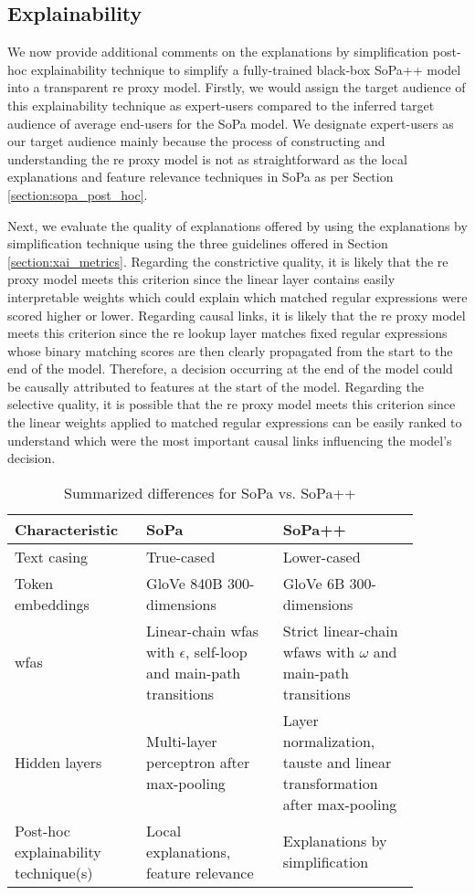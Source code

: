 \subsection{Explainability}

We now provide additional comments on the explanations by simplification
post-hoc explainability technique to simplify a fully-trained black-box SoPa++
model into a transparent \ac{re} proxy model. Firstly, we would assign the target
audience of this explainability technique as expert-users compared to the
inferred target audience of average end-users for the SoPa model. We designate
expert-users as our target audience mainly because the process of constructing
and understanding the \ac{re} proxy model is not as straightforward as the local
explanations and feature relevance techniques in SoPa as per Section
\ref{section:sopa_post_hoc}.

Next, we evaluate the quality of explanations offered by using the explanations
by simplification technique using the three guidelines offered in Section
\ref{section:xai_metrics}. Regarding the constrictive quality, it is likely that
the \ac{re} proxy model meets this criterion since the linear layer contains
easily interpretable weights which could explain which matched regular
expressions were scored higher or lower. Regarding causal links, it is likely
that the \ac{re} proxy model meets this criterion since the \ac{re} lookup layer
matches fixed regular expressions whose binary matching scores are then clearly
propagated from the start to the end of the model. Therefore, a decision
occurring at the end of the model could be causally attributed to features at
the start of the model. Regarding the selective quality, it is possible that the
\ac{re} proxy model meets this criterion since the linear weights applied to
matched regular expressions can be easily ranked to understand which were the
most important causal links influencing the model's decision.

\begin{table}[t!]
  \centering {}
  \begin{tabular}{L{0.275\linewidth} L{0.3\linewidth} L{0.3\linewidth}}
    \toprule
    Characteristic & SoPa & SoPa++ \\
    \midrule
    Text casing & True-cased & Lower-cased \\ 
    Token embeddings & GloVe 840B 300-dimensions & GloVe 6B 300-dimensions \\
    \ac{wfas} & Linear-chain \ac{wfas} with $\epsilon$, self-loop and main-path transitions & Strict linear-chain \ac{wfaws} with $\omega$ and main-path transitions \\
    Hidden layers & Multi-layer perceptron after max-pooling & Layer normalization, \ac{tauste} and linear transformation after max-pooling \\
    Post-hoc explainability technique(s) & Local explanations, feature relevance & Explanations by simplification \\
    \bottomrule
  \end{tabular}
  \caption{Summarized differences for SoPa vs. SoPa++}
  \label{tab:sopa_spp_comparison}
\end{table}

